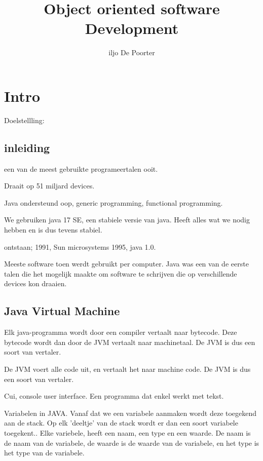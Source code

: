 \documentclass{article}
\author{iljo De Poorter}
\title{Object oriented software Development}
\begin{document}
\maketitle
\section{Intro}
Doelstellling:

\subsection{inleiding}
een van de meest gebruikte programeertalen ooit.

Draait op 51 miljard devices.

Java ondersteund oop, generic programming, functional programming.

We gebruiken java 17 SE, een stabiele versie van java. Heeft alles wat we nodig hebben en is dus tevens stabiel.

ontstaan;
1991, Sun microsystems
1995, java 1.0. 


Meeste software toen werdt gebruikt per computer. Java was een van de eerste talen die het mogelijk maakte om software te schrijven die op verschillende devices kon draaien.

\subsection{Java Virtual Machine}
Elk java-programma wordt door een compiler vertaalt naar bytecode. Deze bytecode wordt dan door de JVM vertaalt naar machinetaal. De JVM is dus een soort van vertaler.

De JVM voert alle code uit, en vertaalt het naar machine code. De JVM is dus een soort van vertaler.

Cui, console user interface. Een programma dat enkel werkt met tekst.

Variabelen in JAVA. Vanaf dat we een variabele aanmaken wordt deze toegekend aan de stack. Op elk 'deeltje' van de stack wordt er dan een soort variabele toegekent..
Elke variebele, heeft een naam, een type en een waarde. De naam is de naam van de variabele, de waarde is de waarde van de variabele, en het type is het type van de variabele.
\end{document}
